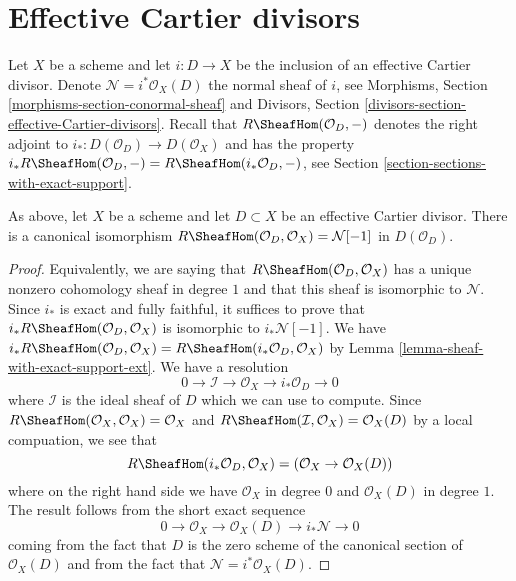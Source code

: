 \section{Effective Cartier divisors}
\label{section-dualizing-Cartier}

\noindent
Let $X$ be a scheme and let $i : D \to X$ be the inclusion of an
effective Cartier divisor. Denote $\mathcal{N} = i^*\mathcal{O}_X(D)$
the normal sheaf of $i$, see
Morphisms, Section \ref{morphisms-section-conormal-sheaf}
and
Divisors, Section \ref{divisors-section-effective-Cartier-divisors}.
Recall that $R\SheafHom(\mathcal{O}_D, -)$
denotes the right adjoint to $i_* : D(\mathcal{O}_D) \to D(\mathcal{O}_X)$
and has the property
$i_*R\SheafHom(\mathcal{O}_D, -) = R\SheafHom(i_*\mathcal{O}_D, -)$,
see Section \ref{section-sections-with-exact-support}.

\begin{lemma}
\label{lemma-compute-for-effective-Cartier}
As above, let $X$ be a scheme and let $D \subset X$ be an
effective Cartier divisor. There is a canonical isomorphism
$R\SheafHom(\mathcal{O}_D, \mathcal{O}_X) = \mathcal{N}[-1]$
in $D(\mathcal{O}_D)$.
\end{lemma}

\begin{proof}
Equivalently, we are saying that $R\SheafHom(\mathcal{O}_D, \mathcal{O}_X)$
has a unique nonzero cohomology sheaf in degree $1$ and that this
sheaf is isomorphic to $\mathcal{N}$. Since $i_*$ is exact and fully
faithful, it suffices to prove that
$i_*R\SheafHom(\mathcal{O}_D, \mathcal{O}_X)$ is isomorphic
to $i_*\mathcal{N}[-1]$. We have
$i_*R\SheafHom(\mathcal{O}_D, \mathcal{O}_X) =
R\SheafHom(i_*\mathcal{O}_D, \mathcal{O}_X)$
by Lemma \ref{lemma-sheaf-with-exact-support-ext}. We have a resolution
$$
0 \to \mathcal{I} \to \mathcal{O}_X \to i_*\mathcal{O}_D \to 0
$$
where $\mathcal{I}$ is the ideal sheaf of $D$
which we can use to compute. Since
$R\SheafHom(\mathcal{O}_X, \mathcal{O}_X) = \mathcal{O}_X$ and
$R\SheafHom(\mathcal{I}, \mathcal{O}_X) = \mathcal{O}_X(D)$ by
a local compuation, we see that
$$
R\SheafHom(i_*\mathcal{O}_D, \mathcal{O}_X) =
(\mathcal{O}_X \to \mathcal{O}_X(D))
$$
where on the right hand side we have $\mathcal{O}_X$ in degree $0$
and $\mathcal{O}_X(D)$ in degree $1$. The result follows from the
short exact sequence
$$
0 \to \mathcal{O}_X \to \mathcal{O}_X(D) \to i_*\mathcal{N} \to 0
$$
coming from the fact that $D$ is the zero scheme of the canonical section
of $\mathcal{O}_X(D)$ and from the fact that
$\mathcal{N} = i^*\mathcal{O}_X(D)$.
\end{proof}

